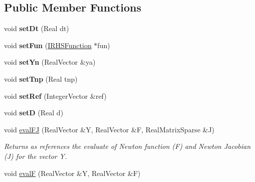 \subsection*{Public Member Functions}
\begin{DoxyCompactItemize}
\item 
\hypertarget{classTRBDF2SolverNewtonFunction_a6ac29ab69be7c879fc2a271367fbcf07}{
void {\bfseries setDt} (Real dt)}
\label{classTRBDF2SolverNewtonFunction_a6ac29ab69be7c879fc2a271367fbcf07}

\item 
\hypertarget{classTRBDF2SolverNewtonFunction_a1daccfe7b6c0294a4601f3995f7af41d}{
void {\bfseries setFun} (\hyperlink{classIRHSFunction}{IRHSFunction} $\ast$fun)}
\label{classTRBDF2SolverNewtonFunction_a1daccfe7b6c0294a4601f3995f7af41d}

\item 
\hypertarget{classTRBDF2SolverNewtonFunction_a87a2b42923fa544d55a3673ae14dc726}{
void {\bfseries setYn} (RealVector \&ya)}
\label{classTRBDF2SolverNewtonFunction_a87a2b42923fa544d55a3673ae14dc726}

\item 
\hypertarget{classTRBDF2SolverNewtonFunction_a29af111aaa1e51f6bb2180561f970f8f}{
void {\bfseries setTnp} (Real tnp)}
\label{classTRBDF2SolverNewtonFunction_a29af111aaa1e51f6bb2180561f970f8f}

\item 
\hypertarget{classTRBDF2SolverNewtonFunction_a89793efd91dbd70e0a0e475f6d1c1be4}{
void {\bfseries setRef} (IntegerVector \&ref)}
\label{classTRBDF2SolverNewtonFunction_a89793efd91dbd70e0a0e475f6d1c1be4}

\item 
\hypertarget{classTRBDF2SolverNewtonFunction_a7203850686dcc6cd5d9d73822eb53c8a}{
void {\bfseries setD} (Real d)}
\label{classTRBDF2SolverNewtonFunction_a7203850686dcc6cd5d9d73822eb53c8a}

\item 
\hypertarget{classTRBDF2SolverNewtonFunction_a94cb1f31efc579ee0a60f5a6b42bb38e}{
void \hyperlink{classTRBDF2SolverNewtonFunction_a94cb1f31efc579ee0a60f5a6b42bb38e}{evalFJ} (RealVector \&Y, RealVector \&F, RealMatrixSparse \&J)}
\label{classTRBDF2SolverNewtonFunction_a94cb1f31efc579ee0a60f5a6b42bb38e}

\begin{DoxyCompactList}\small\item\em Returns as references the evaluate of Newton function (F) and Newton Jacobian (J) for the vector Y. \item\end{DoxyCompactList}\item 
\hypertarget{classTRBDF2SolverNewtonFunction_aabc2c4aa7517049cec92ce9819f6ce18}{
void \hyperlink{classTRBDF2SolverNewtonFunction_aabc2c4aa7517049cec92ce9819f6ce18}{evalF} (RealVector \&Y, RealVector \&F)}
\label{classTRBDF2SolverNewtonFunction_aabc2c4aa7517049cec92ce9819f6ce18}


\end{DoxyCompactItemize}
